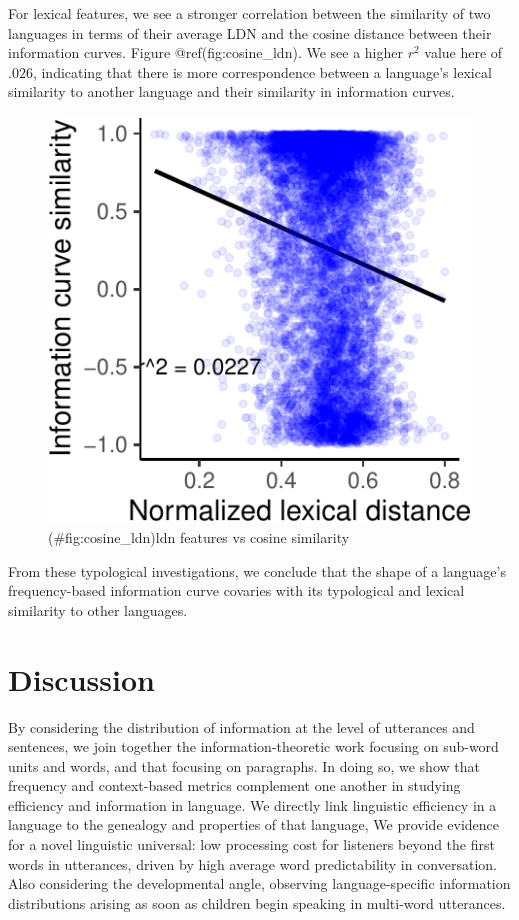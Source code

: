 \documentclass[man,floatsintext]{apa6}
\begin{document}
For lexical features, we see a stronger correlation between the similarity of two languages in terms of their average LDN and the cosine distance between their information curves. Figure @ref(fig:cosine\_ldn). We see a higher \(r^2\) value here of \(.026\), indicating that there is more correspondence between a language's lexical similarity to another language and their similarity in information curves.

\begin{figure}
\centering
\includegraphics{figs/cosine_ldn-1.pdf}
\caption{(\#fig:cosine\_ldn)ldn features vs cosine similarity}
\end{figure}

From these typological investigations, we conclude that the shape of a language's frequency-based information curve covaries with its typological and lexical similarity to other languages.

\hypertarget{discussion}{%
\section{Discussion}\label{discussion}}

By considering the distribution of information at the level of utterances and sentences, we join together the information-theoretic work focusing on sub-word units and words, and that focusing on paragraphs. In doing so, we show that frequency and context-based metrics complement one another in studying efficiency and information in language. We directly link linguistic efficiency in a language to the genealogy and properties of that language, We provide evidence for a novel linguistic universal: low processing cost for listeners beyond the first words in utterances, driven by high average word predictability in conversation. Also considering the developmental angle, observing language-specific information distributions arising as soon as children begin speaking in multi-word utterances.
\end{document}
